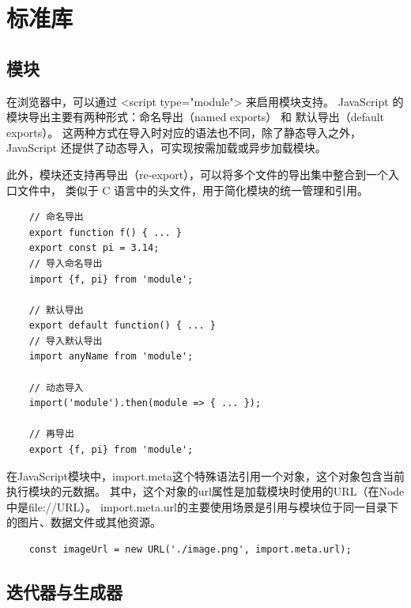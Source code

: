 \section{标准库}
\subsection{模块}
在浏览器中，可以通过 <script type="module"> 来启用模块支持。
JavaScript 的模块导出主要有两种形式：命名导出（named exports） 和 默认导出（default exports）。
这两种方式在导入时对应的语法也不同，除了静态导入之外，JavaScript 还提供了动态导入，可实现按需加载或异步加载模块。

此外，模块还支持再导出（re-export），可以将多个文件的导出集中整合到一个入口文件中，
类似于 C 语言中的头文件，用于简化模块的统一管理和引用。
\begin{verbatim}
    // 命名导出
    export function f() { ... }
    export const pi = 3.14;
    // 导入命名导出
    import {f, pi} from 'module';

    // 默认导出
    export default function() { ... }
    // 导入默认导出
    import anyName from 'module';

    // 动态导入
    import('module').then(module => { ... });

    // 再导出
    export {f, pi} from 'module';
\end{verbatim}

在JavaScript模块中，import.meta这个特殊语法引用一个对象，这个对象包含当前执行模块的元数据。
其中，这个对象的url属性是加载模块时使用的URL（在Node中是file://URL）。
import.meta.url的主要使用场景是引用与模块位于同一目录下的图片、数据文件或其他资源。
\begin{verbatim}
    const imageUrl = new URL('./image.png', import.meta.url);
\end{verbatim}

\subsection{迭代器与生成器}
